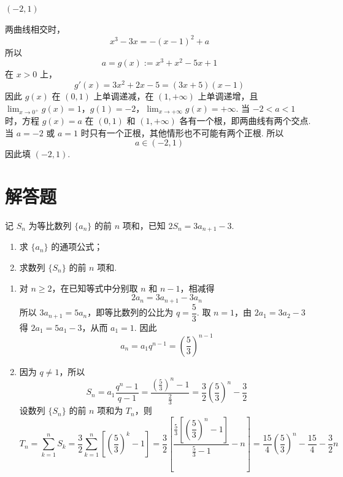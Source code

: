 \begin{answer}
\((-2,1)\)
\end{answer}

\begin{solution}
两曲线相交时，
\[
x^3-3x=-(x-1)^2+a
\]
所以
\[
a=g(x):=x^3+x^2-5x+1
\]
在 \(x>0\) 上，
\[
g'(x)=3x^2+2x-5=(3x+5)(x-1)
\]
因此 \(g(x)\) 在 \((0,1)\) 上单调递减，在 \((1,+\infty)\) 上单调递增，且
\(\lim_{x\to0^+}g(x)=1\)，\(g(1)=-2\)，\(\lim_{x\to+\infty}g(x)=+\infty\).
当 \(-2<a<1\) 时，方程 \(g(x)=a\) 在 \((0,1)\) 和 \((1,+\infty)\) 各有一个根，即两曲线有两个交点. 当 \(a=-2\) 或 \(a=1\) 时只有一个正根，其他情形也不可能有两个正根. 所以
\[
a\in(-2,1)
\]
因此填 \((-2,1)\).
\end{solution}

\section{解答题}

\begin{problem}
记 \(S_n\) 为等比数列 \(\{a_n\}\) 的前 \(n\) 项和，已知 \(2S_n=3a_{n+1}-3\).
\begin{enumerate}
\item 求 \(\{a_n\}\) 的通项公式；
\item 求数列 \(\{S_n\}\) 的前 \(n\) 项和.
\end{enumerate}
\end{problem}

\begin{solution}
\begin{enumerate}
\item 对 \(n\ge2\)，在已知等式中分别取 \(n\) 和 \(n-1\)，相减得
\[
2a_n=3a_{n+1}-3a_n
\]
所以 \(3a_{n+1}=5a_n\)，即等比数列的公比为 \(q=\dfrac53\). 取 \(n=1\)，由 \(2a_1=3a_2-3\) 得 \(2a_1=5a_1-3\)，从而 \(a_1=1\). 因此
\[
a_n=a_1q^{n-1}=\left(\dfrac53\right)^{n-1}
\]
\item 因为 \(q\ne1\)，所以
\[
S_n=a_1\frac{q^n-1}{q-1}=\frac{(\frac{5}{3})^n-1}{\frac{2}{3}}=\frac32\left(\dfrac53\right)^n-\frac32
\]
设数列 \(\{S_n\}\) 的前 \(n\) 项和为 \(T_n\)，则
\[
T_n=\sum_{k=1}^nS_k=\frac32\sum_{k=1}^n\left[\left(\dfrac53\right)^k-1\right]
=\frac32\left[\frac{\frac53\left[\left(\dfrac53\right)^n-1\right]}{\frac53-1}-n\right]
=\frac{15}{4}\left(\dfrac53\right)^n-\frac{15}{4}-\frac32n
\]
\end{enumerate}
\end{solution}

